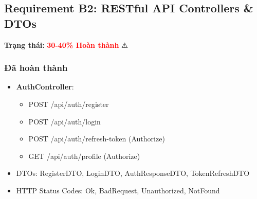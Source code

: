 \documentclass[12pt,a4paper]{report}
\begin{document}
\newpage

\subsection{Requirement B2: RESTful API Controllers \& DTOs}
\textbf{Trạng thái: } \textcolor{red}{\textbf{30-40\% Hoàn thành}} ⚠️

\subsubsection{Đã hoàn thành}
\begin{itemize}
    \item[$\checkmark$] \textbf{AuthController}:
    \begin{itemize}
        \item POST /api/auth/register
        \item POST /api/auth/login
        \item POST /api/auth/refresh-token (Authorize)
        \item GET /api/auth/profile (Authorize)
    \end{itemize}
    \item[$\checkmark$] DTOs: RegisterDTO, LoginDTO, AuthResponseDTO, TokenRefreshDTO
    \item[$\checkmark$] HTTP Status Codes: Ok, BadRequest, Unauthorized, NotFound
\end{itemize}
\end{document}

